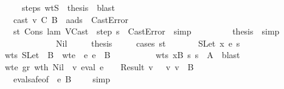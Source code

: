 \begin{isabellebody}
\ \ \ \ \ \ \ \ \ \ \isamarkupfalse \ steps\ wtS\ \isamarkupfalse \ {\isacharquery}thesis\ \isamarkupfalse \ blast\isanewline
\ \ \ \ \ \ \ \ \isamarkupfalse \isanewline
\ \ \ \ \ \ \isamarkupfalse \isanewline
\ \ \ \ \ \ \ \ \isamarkupfalse \ {\isachardoublequoteopen}cast\ v\ C\ B{\isacharprime}\ {\isasymmu}\ {\isacharparenleft}a{\isacharhash}ads{\isacharprime}{\isacharparenright}\ {\isacharequal}\ CastError{\isachardoublequoteclose}\isanewline
\ \ \ \ \ \ \ \ \isamarkupfalse \ st\ Cons\ lam\ VCast\ \isamarkupfalse \ {\isachardoublequoteopen}step\ s\ {\isacharequal}\ CastError{\isachardoublequoteclose}\ \isamarkupfalse \ simp\isanewline
\ \ \ \ \ \ \ \ \isamarkupfalse \ {\isacharquery}thesis\ \isamarkupfalse \ simp\isanewline
\ \ \ \ \ \ \isamarkupfalse \isanewline
\ \ \ \ \isamarkupfalse \isanewline
\ \ \isamarkupfalse \isanewline
\ \ \ \ \isamarkupfalse \ Nil\isanewline
\ \ \ \ \isamarkupfalse \ {\isacharquery}thesis\isanewline
\ \ \ \ \isamarkupfalse \ {\isacharparenleft}cases\ st{\isacharparenright}\isanewline
\ \ \ \ \ \ \isamarkupfalse \ {\isacharparenleft}SLet\ x\ e\ s{}{\isacharparenright}\isanewline
\ \ \ \ \ \ \isamarkupfalse \ wts\ SLet\ \isamarkupfalse \ B\ \ wte{\isacharcolon}\ {\isachardoublequoteopen}{\isasymGamma}\ {\isasymturnstile}\isactrlisub e\ e\ {\isacharcolon}\ B{\isachardoublequoteclose}\ \isanewline
\ \ \ \ \ \ \ \ \ wts{}{\isacharcolon}\ {\isachardoublequoteopen}{\isacharparenleft}x{\isacharcomma}B{\isacharparenright}{\isacharhash}{\isasymGamma}\ {\isasymturnstile}\isactrlisub s\ s{}\ {\isacharcolon}\ A{\isacharprime}{\isachardoublequoteclose}\ \isamarkupfalse \ blast\isanewline
\ \ \ \ \ \ \isamarkupfalse \ wte\ gr\ wt{\isacharunderscore}h\ Nil\ \isamarkupfalse \ {\isachardoublequoteopen}{\isacharparenleft}{\isasymexists}v{\isachardot}\ eval\ e\ {\isasymrho}\ {\isasymmu}\ {\isacharequal}\ Result\ v\ {\isasymand}\ {\isasymSigma}\ {\isasymturnstile}v\ v\ {\isacharcolon}\ B{\isacharparenright}{\isachardoublequoteclose}\isanewline
\ \ \ \ \ \ \ \ \isamarkupfalse \ eval{\isacharunderscore}safe{\isacharbrackleft}of\ {\isasymGamma}\ e\ B\ {\isasymSigma}\ {\isasymrho}\ {\isasymmu}{\isacharbrackright}\ \isamarkupfalse \ simp\isanewline

\end{isabellebody}
